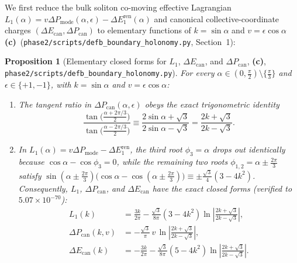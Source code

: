 \documentclass[11pt,a4paper]{article}
\newtheorem{proposition}[theorem]{Proposition}
\theoremstyle{remark}
\newcommand{\Lc}{\textbf{(c)}}
\newcommand{\shol}{\texttt{phase2/\allowbreak scripts/\allowbreak defb\_\allowbreak boundary\_\allowbreak holonomy.py}}
\begin{document}
We first reduce the bulk soliton co-moving effective Lagrangian
$L_1(\alpha) = v\Delta P_{\mathrm{mode}}(\alpha,\epsilon) - \Delta E_1^{\mathrm{ren}}(\alpha)$
and canonical collective-coordinate charges
$(\Delta E_{\mathrm{can}},\Delta P_{\mathrm{can}})$ to elementary functions of
$k = \sin\alpha$ and $v = \epsilon\cos\alpha$ \Lc\ (\shol, Section~1):

\begin{proposition}[Elementary closed forms for $L_1$, $\Delta E_{\mathrm{can}}$, and $\Delta P_{\mathrm{can}}$, \Lc, \shol]\label{prop:can_closed}
For every $\alpha \in (0,\frac{\pi}{2})\setminus\{\frac{\pi}{3}\}$ and
$\epsilon \in \{+1,-1\}$, with $k = \sin\alpha$ and $v = \epsilon\cos\alpha$:
\begin{enumerate}
\item The tangent ratio in $\Delta P_{\mathrm{can}}(\alpha,\epsilon)$ obeys the
exact trigonometric identity
\begin{equation}\label{eq:tan_ratio_id}
  \frac{\tan\!\big(\frac{\alpha + 2\pi/3}{2}\big)}{\tan\!\big(\frac{\alpha - 2\pi/3}{2}\big)}
  \equiv \frac{2\sin\alpha + \sqrt{3}}{2\sin\alpha - \sqrt{3}}
  = \frac{2k + \sqrt{3}}{2k - \sqrt{3}}.
\end{equation}
\item In $L_1(\alpha) = v\Delta P_{\mathrm{mode}} - \Delta E_1^{\mathrm{ren}}$,
the third root $\phi_3 = \alpha$ drops out identically because
$\cos\alpha - \cos\phi_3 = 0$, while the remaining two roots
$\phi_{1,2} = \alpha \pm \frac{2\pi}{3}$ satisfy
$\sin(\alpha \pm \frac{2\pi}{3})\big(\cos\alpha - \cos(\alpha \pm \frac{2\pi}{3})\big) \equiv \pm\frac{\sqrt{3}}{4}(3 - 4k^2)$.
Consequently, $L_1$, $\Delta P_{\mathrm{can}}$, and $\Delta E_{\mathrm{can}}$
have the exact closed forms (verified to $5.07\times 10^{-70}$):
\begin{align}
  L_1(k) &= \frac{3k}{2\pi} - \frac{\sqrt{3}}{8\pi}(3 - 4k^2)\ln\left|\frac{2k + \sqrt{3}}{2k - \sqrt{3}}\right|, \label{eq:L1_closed}\\
  \Delta P_{\mathrm{can}}(k,v) &= -\frac{\sqrt{3}}{\pi}\,v\,\ln\left|\frac{2k + \sqrt{3}}{2k - \sqrt{3}}\right|, \label{eq:Pcan_closed}\\
  \Delta E_{\mathrm{can}}(k) &= -\frac{3k}{2\pi} - \frac{\sqrt{3}}{8\pi}(5 - 4k^2)\ln\left|\frac{2k + \sqrt{3}}{2k - \sqrt{3}}\right|. \label{eq:Ecan_closed}
\end{align}
\end{enumerate}
\end{proposition}
\end{document}
